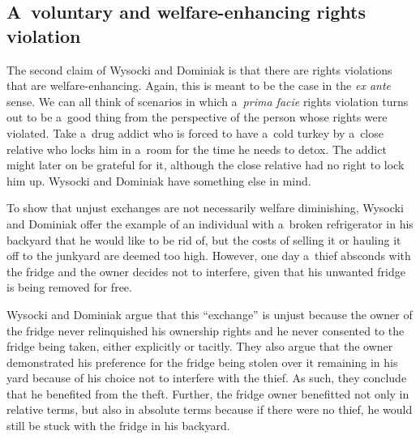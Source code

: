 \subsection{A~voluntary and welfare-enhancing rights violation}



The second claim of Wysocki and Dominiak 
\parencite*[][]{wysocki_how_2023} %
 is that there are rights violations that are welfare-enhancing. Again, this is meant to be the case in the \textit{ex ante} sense. We can all think of scenarios in which a~\textit{prima facie} rights violation turns out to be a~good thing from the perspective of the person whose rights were violated. Take a~drug addict who is forced to have a~cold turkey by a~close relative who locks him in a~room for the time he needs to detox. The addict might later on be grateful for it, although the close relative had no right to lock him up. Wysocki and Dominiak have something else in mind.



To show that unjust exchanges are not necessarily welfare diminishing, Wysocki and Dominiak 
\parencite*[][]{wysocki_how_2023} %
 offer the example of an individual with a~broken refrigerator in his backyard that he would like to be rid of, but the costs of selling it or hauling it off to the junkyard are deemed too high. However, one day a~thief absconds with the fridge and the owner decides not to interfere, given that his unwanted fridge is being removed for free.



Wysocki and Dominiak argue that this ``exchange'' is unjust because the owner of the fridge never relinquished his ownership rights and he never consented to the fridge being taken, either explicitly or tacitly. They also argue that the owner demonstrated his preference for the fridge being stolen over it remaining in his yard because of his choice not to interfere with the thief. As such, they conclude that he benefited from the theft. Further, the fridge owner benefitted not only in relative terms, but also in absolute terms because if there were no thief, he would still be stuck with the fridge in his backyard.



